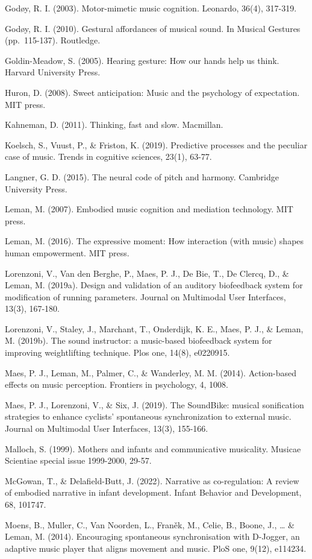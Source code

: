 \documentclass[
]{book}
\theoremstyle{definition}
\theoremstyle{definition}
\theoremstyle{definition}
\theoremstyle{definition}
\theoremstyle{remark}
\begin{document}
Godøy, R. I. (2003). Motor-mimetic music cognition. Leonardo, 36(4), 317-319.

Godøy, R. I. (2010). Gestural affordances of musical sound. In Musical Gestures (pp.~115-137). Routledge.

Goldin-Meadow, S. (2005). Hearing gesture: How our hands help us think. Harvard University Press.

Huron, D. (2008). Sweet anticipation: Music and the psychology of expectation. MIT press.

Kahneman, D. (2011). Thinking, fast and slow. Macmillan.

Koelsch, S., Vuust, P., \& Friston, K. (2019). Predictive processes and the peculiar case of music. Trends in cognitive sciences, 23(1), 63-77.

Langner, G. D. (2015). The neural code of pitch and harmony. Cambridge University Press.

Leman, M. (2007). Embodied music cognition and mediation technology. MIT press.

Leman, M. (2016). The expressive moment: How interaction (with music) shapes human empowerment. MIT press.

Lorenzoni, V., Van den Berghe, P., Maes, P. J., De Bie, T., De Clercq, D., \& Leman, M. (2019a). Design and validation of an auditory biofeedback system for modification of running parameters. Journal on Multimodal User Interfaces, 13(3), 167-180.

Lorenzoni, V., Staley, J., Marchant, T., Onderdijk, K. E., Maes, P. J., \& Leman, M. (2019b). The sound instructor: a music-based biofeedback system for improving weightlifting technique. Plos one, 14(8), e0220915.

Maes, P. J., Leman, M., Palmer, C., \& Wanderley, M. M. (2014). Action-based effects on music perception. Frontiers in psychology, 4, 1008.

Maes, P. J., Lorenzoni, V., \& Six, J. (2019). The SoundBike: musical sonification strategies to enhance cyclists' spontaneous synchronization to external music. Journal on Multimodal User Interfaces, 13(3), 155-166.

Malloch, S. (1999). Mothers and infants and communicative musicality. Musicae Scientiae special issue 1999-2000, 29-57.

McGowan, T., \& Delafield-Butt, J. (2022). Narrative as co-regulation: A review of embodied narrative in infant development. Infant Behavior and Development, 68, 101747.

Moens, B., Muller, C., Van Noorden, L., Franěk, M., Celie, B., Boone, J., \ldots{} \& Leman, M. (2014). Encouraging spontaneous synchronisation with D-Jogger, an adaptive music player that aligns movement and music. PloS one, 9(12), e114234.
\end{document}
